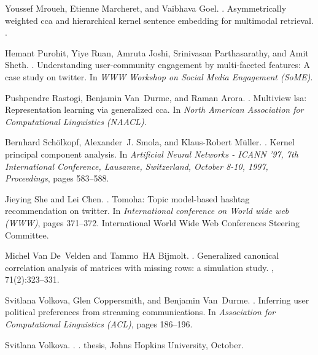 \documentclass{article}
\begin{document}
\begin{thebibliography}{}
Youssef Mroueh, Etienne Marcheret, and Vaibhava Goel.
.
\newblock Asymmetrically weighted cca and hierarchical kernel sentence
  embedding for multimodal retrieval.
.

Hemant Purohit, Yiye Ruan, Amruta Joshi, Srinivasan Parthasarathy, and Amit
  Sheth.
.
\newblock Understanding user-community engagement by multi-faceted features: A
  case study on twitter.
\newblock In {\em WWW Workshop on Social Media Engagement (SoME)}.

Pushpendre Rastogi, Benjamin Van~Durme, and Raman Arora.
.
\newblock Multiview lsa: Representation learning via generalized cca.
\newblock In {\em North American Association for Computational Linguistics
  (NAACL)}.

Bernhard Sch{\"{o}}lkopf, Alexander~J. Smola, and Klaus{-}Robert M{\"{u}}ller.
.
\newblock Kernel principal component analysis.
\newblock In {\em Artificial Neural Networks - {ICANN} '97, 7th International
  Conference, Lausanne, Switzerland, October 8-10, 1997, Proceedings}, pages
  583--588.

Jieying She and Lei Chen.
.
\newblock Tomoha: Topic model-based hashtag recommendation on twitter.
\newblock In {\em International conference on World wide web (WWW)}, pages
  371--372. International World Wide Web Conferences Steering Committee.

Michel Van De~Velden and Tammo~HA Bijmolt.
.
\newblock Generalized canonical correlation analysis of matrices with missing
  rows: a simulation study.
, 71(2):323--331.

Svitlana Volkova, Glen Coppersmith, and Benjamin Van~Durme.
.
\newblock Inferring user political preferences from streaming communications.
\newblock In {\em Association for Computational Linguistics (ACL)}, pages
  186--196.

Svitlana Volkova.
.
.
 thesis, Johns Hopkins University, October.


\end{thebibliography}
\end{document}
